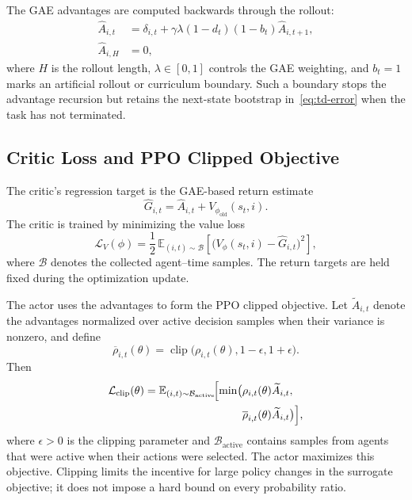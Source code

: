 \documentclass[letterpaper,10pt,conference]{ieeeconf}
\begin{document}
The GAE advantages are computed backwards through the rollout:
\begin{equation}
\begin{aligned}
    \widehat{A}_{i,t}
    &= \delta_{i,t}
      + \gamma\lambda(1-d_t)(1-b_t)\widehat{A}_{i,t+1},\\
    \widehat{A}_{i,H}&=0,
\end{aligned}
    \label{eq:gae}
\end{equation}
where $H$ is the rollout length, $\lambda\in[0,1]$ controls the GAE
weighting, and $b_t=1$ marks an artificial rollout or curriculum boundary.
Such a boundary stops the advantage recursion but retains the next-state
bootstrap in~\eqref{eq:td-error} when the task has not terminated.

\subsection{Critic Loss and PPO Clipped Objective}

The critic's regression target is the GAE-based return estimate
\begin{equation}
    \widehat{G}_{i,t}
    = \widehat{A}_{i,t} + V_{\phi_{\mathrm{old}}}(s_t,i).
    \label{eq:value-target}
\end{equation}
The critic is trained by minimizing the value loss
\begin{equation}
    \mathcal{L}_{V}(\phi)
    = \frac{1}{2}\,
      \mathbb{E}_{(i,t)\sim\mathcal{B}}\!\left[
        \bigl(V_\phi(s_t,i)-\widehat{G}_{i,t}\bigr)^2
      \right],
    \label{eq:critic-loss}
\end{equation}
where $\mathcal{B}$ denotes the collected agent--time samples. The return
targets are held fixed during the optimization update.

The actor uses the advantages to form the PPO clipped objective. Let
$\widetilde{A}_{i,t}$ denote the advantages normalized over active decision
samples when their variance is nonzero, and define
\begin{equation}
    \overline{\rho}_{i,t}(\theta)
    = \operatorname{clip}\bigl(\rho_{i,t}(\theta),1-\epsilon,1+\epsilon\bigr).
\end{equation}
Then
\begin{equation}
\begin{aligned}
    \mathcal{L}_{\mathrm{clip}}(\theta)
    = \mathbb{E}_{(i,t)\sim\mathcal{B}_{\mathrm{active}}}\!\Bigl[
        \min\bigl(&\rho_{i,t}(\theta)\widetilde{A}_{i,t},\\
                 &\overline{\rho}_{i,t}(\theta)\widetilde{A}_{i,t}\bigr)
      \Bigr],
\end{aligned}
    \label{eq:ppo-clipping}
\end{equation}
where $\epsilon>0$ is the clipping parameter and
$\mathcal{B}_{\mathrm{active}}$ contains samples from agents that were
active when their actions were selected. The actor maximizes this objective.
Clipping limits the incentive for large policy changes in the surrogate
objective; it does not impose a hard bound on every probability ratio.
\end{document}
